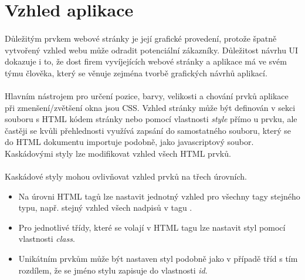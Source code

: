 \documentclass[11pt,a4paper,titlepage,oneside]{book}
\begin{document}

	\section{Vzhled aplikace}



		\paragraph{} Důležitým prvkem webové stránky je její grafické provedení, protože špatně vytvořený vzhled webu může odradit potenciální zákazníky. Důležitost návrhu \ac{UI} dokazuje i to, že dost firem vyvíjejících webové stránky a aplikace má ve svém týmu člověka, který se věnuje zejména tvorbě grafických návrhů aplikací.


		\paragraph{} Hlavním nástrojem pro určení pozice, barvy, velikosti a chování prvků aplikace při zmenšení/zvětšení okna jsou \ac{CSS}. Vzhled stránky může být definován v sekci  souboru s HTML kódem stránky nebo pomocí vlastnosti \textit{style} přímo u prvku, ale častěji se kvůli přehlednosti využívá zapsání do samostatného souboru, který se do HTML dokumentu importuje podobně, jako javascriptový soubor. Kaskádovými styly lze modifikovat vzhled všech HTML prvků. 



		\paragraph{} Kaskádové styly mohou ovlivňovat vzhled prvků na třech úrovních.
				\begin{itemize}
					\item Na úrovni \ac{HTML} tagů lze nastavit jednotný vzhled pro všechny tagy stejného typu, např. stejný vzhled všech nadpisů v tagu .
					\item Pro jednotlivé třídy, které se volají v \ac{HTML} tagu lze nastavit styl pomocí vlastnosti \textit{class}.
					\item Unikátním prvkům může být nastaven styl podobně jako v případě tříd s tím rozdílem, že se jméno stylu zapisuje do vlastnosti \textit{id}.
				\end{itemize}
\end{document}
